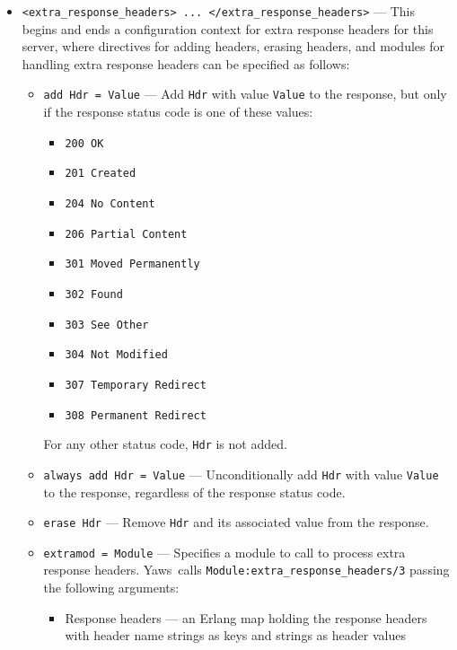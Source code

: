\documentclass[11pt,oneside,english]{book}
\newcommand{\Yaws}            %
        {{\sc Yaws}}
\begin{document}
\begin{itemize}
              This setting applies only for \verb+out/1+ content, not
              to static pages or other returned content.

\item       \verb+<extra_response_headers> ... </extra_response_headers>+ ---
              This begins and ends a configuration context for extra
              response headers for this server, where directives for
              adding headers, erasing headers, and modules for
              handling extra response headers can be specified as follows:

              \begin{itemize}
                \item \verb+add Hdr = Value+ --- Add \verb+Hdr+ with
                  value \verb+Value+ to the response, but only if the
                  response status code is one of these values:
                  \begin{itemize}
                    \item \verb+200 OK+
                    \item \verb+201 Created+
                    \item \verb+204 No Content+
                    \item \verb+206 Partial Content+
                    \item \verb+301 Moved Permanently+
                    \item \verb+302 Found+
                    \item \verb+303 See Other+
                    \item \verb+304 Not Modified+
                    \item \verb+307 Temporary Redirect+
                    \item \verb+308 Permanent Redirect+
                  \end{itemize}
                  For any other status code, \verb+Hdr+ is not added.

                \item \verb+always add Hdr = Value+ ---
                  Unconditionally add \verb+Hdr+ with value
                  \verb+Value+ to the response, regardless of the
                  response status code.

                \item \verb+erase Hdr+ --- Remove \verb+Hdr+ and its
                  associated value from the response.

                \item \verb+extramod = Module+ --- Specifies a module
                  to call to process extra response
                  headers. \Yaws\ calls
                  \verb+Module:extra_response_headers/3+ passing the
                  following arguments:
                  \begin{itemize}
                    \item Response headers --- an Erlang map holding
                      the response headers with header name strings as
                      keys and strings as header values


\end{itemize}
\end{itemize}
\end{itemize}
\end{document}
